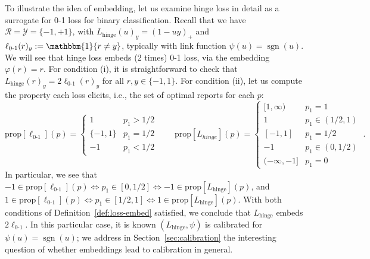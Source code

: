 \documentclass[12pt]{article}
\newcommand{\prop}[1]{\mathrm{prop}[#1]}
\newcommand{\simplex}{\Delta_\Y}
\newcommand{\R}{\mathcal{R}}
\newcommand{\Y}{\mathcal{Y}}
\newcommand{\inprod}[2]{\langle #1, #2 \rangle}%
\newcommand{\ones}{\mathbbm{1}}
\newcommand{\Ind}[1]{\ones\{#1\}}
\newcommand{\hinge}{L_{\mathrm{hinge}}}
\newcommand{\ellzo}{\ell_{\text{0-1}}}
\DeclareMathOperator*{\sgn}{sgn}
\begin{document}
To illustrate the idea of embedding, let us examine hinge loss in detail as a surrogate for 0-1 loss for binary classification.
Recall that we have $\R = \Y = \{-1, +1\}$, with $\hinge(u)_y = (1 - uy)_+$ and $\ellzo(r)_y := \Ind{r\neq y}$, typically with link function $\psi(u) = \sgn(u)$.
We will see that hinge loss embeds (2 times) 0-1 loss, via the embedding $\varphi(r) = r$.
For condition (i), it is straightforward to check that $\hinge(r)_y = 2\ellzo(r)_y$ for all $r,y\in\{-1,1\}$.
For condition (ii), let us compute the property each loss elicits, i.e., the set of optimal reports for each $p$:
\[
\prop{\ellzo}(p) = \begin{cases}
1 & p_1 > 1/2 \\
\{-1,1\} & p_1 = 1/2\\
-1 & p_1 < 1/2
\end{cases}
\qquad 
\prop{L_{hinge}}(p) = \begin{cases}
[1,\infty) & p_1 = 1\\
1 & p_1 \in (1/2,1) \\
[-1,1] & p_1 = 1/2\\
-1& p_1 \in (0, 1/2)\\
(-\infty, -1]& p_1 = 0
\end{cases}~.
\]
In particular, we see that $-1 \in \prop{\ellzo}(p) \iff p_1 \in [0, 1/2] \iff -1 \in \prop{\hinge}(p)$, and $1 \in \prop{\ellzo}(p) \iff p_1 \in [1/2,1] \iff 1 \in \prop{\hinge}(p)$.
With both conditions of Definition~\ref{def:loss-embed} satisfied, we conclude that $\hinge$ embeds $2\ellzo$.
In this particular case, it is known $(\hinge,\psi)$ is calibrated for $\psi(u) = \sgn(u)$; we address in Section~\ref{sec:calibration} the interesting question of whether embeddings lead to calibration in general.

\end{document}
